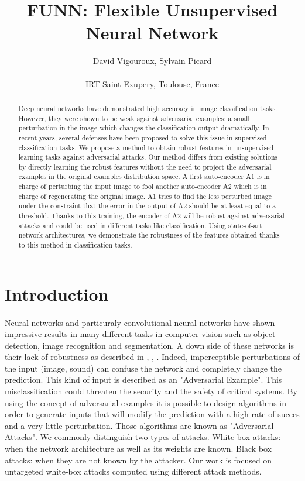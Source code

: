 \documentclass[12pt]{article}
\title{FUNN: Flexible Unsupervised Neural Network}
\author{David Vigouroux, Sylvain Picard\\
\\
\normalsize{IRT Saint Exupery, Toulouse, France}}
\date{}
\begin{document}
\baselineskip24pt


\maketitle


\justify
\begin{abstract}
Deep neural networks have demonstrated high accuracy in image classification tasks. However, they were shown to be weak against adversarial examples: a small perturbation in the image which changes the classification output dramatically. In recent years, several defenses have been proposed to solve this issue in supervised classification tasks. We propose a method to obtain robust features in unsupervised learning tasks against adversarial attacks. Our method differs from existing solutions by directly learning the robust features without the need to project the adversarial examples in the original examples distribution space. A first auto-encoder A1 is in charge of perturbing the input image to fool another auto-encoder A2 which is in charge of regenerating the original image. A1 tries to find the less perturbed image under the constraint that the error in the output of A2 should be at least equal to a threshold. Thanks to this training, the encoder of A2 will be robust against adversarial attacks and could be used in different tasks like classification. Using state-of-art network architectures, we demonstrate the robustness of the features obtained thanks to this method in classification tasks.
\end{abstract}




\section{Introduction}
\paragraph{}
Neural networks and particuraly convolutional neural networks have shown impressive results in many different tasks in computer vision such as object detection, image recognition and segmentation. A down side of these networks is their lack of robustness as described in  \cite{goodfellow_explaining_2014}, \cite{kurakin_adversarial_2016-1}, \cite{szegedy_intriguing_2013}.
Indeed, imperceptible perturbations of the input (image, sound) can confuse the network and completely change the prediction. This kind of input is described as an "Adversarial Example". This misclassification could threaten the security and the safety of critical systems. By using the concept of adversarial examples it is possible to design algorithms in order to generate inputs that will modify the prediction with a high rate of succes and a very little perturbation. Those algorithms are known as "Adversarial Attacks". We commonly distinguish two types of attacks. White box attacks: when the network architecture as well as its weights are known. Black box attacks: when they are not known by the attacker. Our work is focused on  untargeted  white-box  attacks computed  using  different attack methods.
\end{document}
